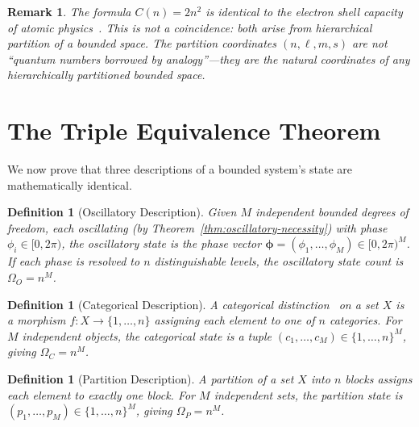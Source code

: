 \documentclass[11pt,twocolumn,a4paper]{article}
\newtheorem{definition}[theorem]{Definition}
\newtheorem{remark}[theorem]{Remark}
\begin{document}
\begin{remark}
The formula $C(n) = 2n^2$ is identical to the electron shell capacity
of atomic physics~\citep{griffiths2018}.  This is not a coincidence:
both arise from hierarchical partition of a bounded space.  The
partition coordinates $(n, \ell, m, s)$ are not ``quantum numbers
borrowed by analogy''---they are the natural coordinates of any
hierarchically partitioned bounded space.
\end{remark}


\section{The Triple Equivalence Theorem}
\label{sec:triple-equivalence}

We now prove that three descriptions of a bounded system's state
are mathematically identical.

\begin{definition}[Oscillatory Description]
\label{def:oscillatory}
Given $M$ independent bounded degrees of freedom, each oscillating
(by Theorem~\ref{thm:oscillatory-necessity}) with phase
$\phi_i \in [0, 2\pi)$, the oscillatory state is the phase vector
$\boldsymbol{\phi} = (\phi_1, \ldots, \phi_M) \in [0, 2\pi)^M$.
If each phase is resolved to $n$ distinguishable levels, the
oscillatory state count is $\Omega_O = n^M$.
\end{definition}

\begin{definition}[Categorical Description]
\label{def:categorical}
A \emph{categorical distinction}~\citep{maclane1998} on a set $X$ is
a morphism $f : X \to \{1, \ldots, n\}$ assigning each element to one
of $n$ categories.  For $M$ independent objects, the categorical state
is a tuple $(c_1, \ldots, c_M) \in \{1, \ldots, n\}^M$, giving
$\Omega_C = n^M$.
\end{definition}

\begin{definition}[Partition Description]
\label{def:partitional}
A \emph{partition} of a set $X$ into $n$ blocks assigns each element
to exactly one block.  For $M$ independent sets, the partition state
is $(p_1, \ldots, p_M) \in \{1, \ldots, n\}^M$, giving
$\Omega_P = n^M$.
\end{definition}
\end{document}
